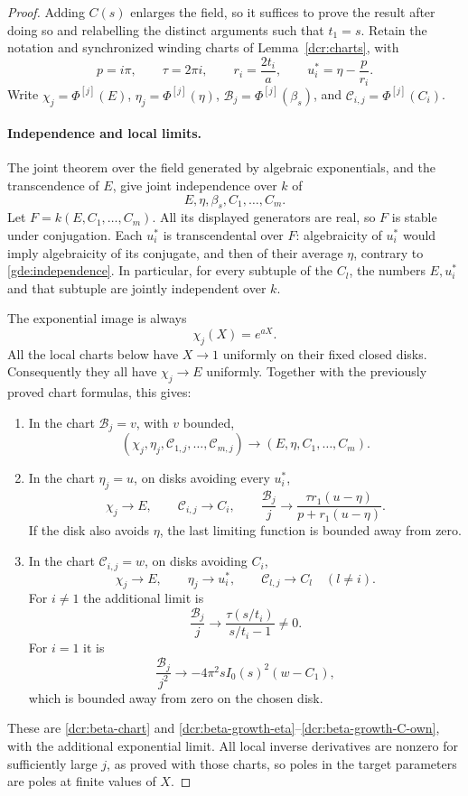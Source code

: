 \documentclass[11pt]{article}
\theoremstyle{definition}
\theoremstyle{remark}
\begin{document}
\begin{proof}
Adding $C(s)$ enlarges the field, so it suffices to prove the result
after doing so and relabelling the distinct arguments such that
$t_1=s$.  Retain the notation and synchronized winding charts of
Lemma~\ref{dcr:charts}, with
\[
 p=i\pi,\qquad \tau=2\pi i,\qquad
 r_i=\frac{2t_i}{a},\qquad u_i^*=\eta-\frac{p}{r_i}.
\]
Write $\chi_j=\Phi^{[j]}(E)$, $\eta_j=\Phi^{[j]}(\eta)$,
$\mathscr B_j=\Phi^{[j]}(\beta_s)$, and
$\mathscr C_{i,j}=\Phi^{[j]}(C_i)$.

\paragraph{Independence and local limits.}
The joint theorem over the field generated by algebraic exponentials,
and the transcendence of $E$, give joint independence over $k$ of
\begin{equation}\label{gde:independence}
 E,\eta,\beta_s,C_1,\ldots,C_m.
\end{equation}
Let $F=k(E,C_1,\ldots,C_m)$.  All its displayed generators are real,
so $F$ is stable under conjugation.  Each $u_i^*$ is transcendental
over $F$: algebraicity of $u_i^*$ would imply algebraicity of its
conjugate, and then of their average $\eta$, contrary to
\eqref{gde:independence}.  In particular, for every subtuple of the
$C_l$, the numbers $E,u_i^*$ and that subtuple are jointly
independent over $k$.

The exponential image is always
\[
                    \chi_j(X)=e^{aX}.
\]
All the local charts below have $X\to1$ uniformly on their fixed
closed disks.  Consequently they all have $\chi_j\to E$ uniformly.
Together with the previously proved chart formulas, this gives:
\begin{enumerate}
\item In the chart $\mathscr B_j=v$, with $v$ bounded,
\[
 (\chi_j,\eta_j,\mathscr C_{1,j},\ldots,\mathscr C_{m,j})
       \longrightarrow(E,\eta,C_1,\ldots,C_m).
\]
\item In the chart $\eta_j=u$, on disks avoiding every $u_i^*$,
\[
 \chi_j\longrightarrow E,\qquad
 \mathscr C_{i,j}\longrightarrow C_i,\qquad
 \frac{\mathscr B_j}{j}\longrightarrow
       \frac{\tau r_1(u-\eta)}{p+r_1(u-\eta)}.
\]
If the disk also avoids $\eta$, the last limiting function is
bounded away from zero.
\item In the chart $\mathscr C_{i,j}=w$, on disks avoiding $C_i$,
\[
 \chi_j\longrightarrow E,\qquad \eta_j\longrightarrow u_i^*,
 \qquad \mathscr C_{l,j}\longrightarrow C_l\quad(l\ne i).
\]
For $i\ne1$ the additional limit is
\[
 \frac{\mathscr B_j}{j}\longrightarrow
              \frac{\tau(s/t_i)}{s/t_i-1}\ne0.
\]
For $i=1$ it is
\[
 \frac{\mathscr B_j}{j^2}\longrightarrow
              -4\pi^2sI_0(s)^2(w-C_1),
\]
which is bounded away from zero on the chosen disk.
\end{enumerate}
These are \eqref{dcr:beta-chart} and
\eqref{dcr:beta-growth-eta}--\eqref{dcr:beta-growth-C-own},
with the additional exponential limit.
All local inverse derivatives are nonzero for sufficiently large
$j$, as proved with those charts, so poles in the target parameters
are poles at finite values of $X$.


\end{proof}
\end{document}
